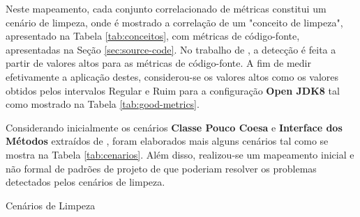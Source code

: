 Neste mapeamento, cada conjunto correlacionado de métricas constitui um cenário de limpeza, onde é mostrado a correlação de um "conceito de limpeza", apresentado na Tabela \ref{tab:conceitos}, com métricas de código-fonte, apresentadas na Seção \ref{sec:source-code}. No trabalho de , a detecção é feita a partir de valores altos para as métricas de código-fonte. A fim de medir efetivamente a aplicação destes, considerou-se os valores altos como os valores obtidos pelos intervalos Regular e Ruim para a configuração \textbf{Open JDK8} tal como mostrado na Tabela \ref{tab:good-metrics}.  

Considerando inicialmente os cenários \textbf{Classe Pouco Coesa} e \textbf{Interface dos Métodos} extraídos de , foram elaborados mais alguns cenários tal como se mostra na Tabela \ref{tab:cenarios}. Além disso, realizou-se um mapeamento inicial e não formal de padrões de projeto de  que poderiam resolver os problemas detectados pelos cenários de limpeza. 

\begin{table}
\begin{table}[H]
\centering

\caption{Cenários de Limpeza}
\label{tab:cenarios}
\end{table}
\FloatBarrier
\end{table}

